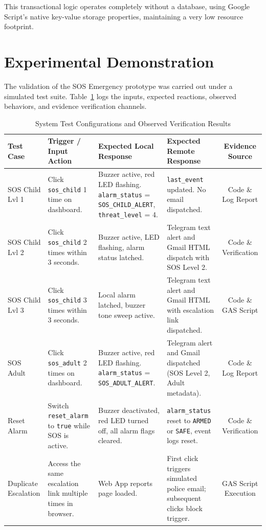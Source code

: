 \documentclass[conference]{IEEEtran}
\begin{document}
This transactional logic operates completely without a database, using Google Script's native key-value storage properties, maintaining a very low resource footprint.

\section{Experimental Demonstration}
The validation of the SOS Emergency prototype was carried out under a simulated test suite. Table~\ref{tab:test_cases} logs the inputs, expected reactions, observed behaviors, and evidence verification channels.

\begin{table}[!t]
\centering
\caption{System Test Configurations and Observed Verification Results}
\label{tab:test_cases}
\scriptsize
\renewcommand{\arraystretch}{1.2}
\begin{tabularx}{\textwidth}{l|p{3.2cm}|p{3.5cm}|p{3.5cm}|c}
\toprule
\textbf{Test Case} & \textbf{Trigger / Input Action} & \textbf{Expected Local Response} & \textbf{Expected Remote Response} & \textbf{Evidence Source} \\
\midrule
SOS Child Lvl 1 & Click \texttt{sos\_child} 1 time on dashboard. & Buzzer active, red LED flashing. \texttt{alarm\_status} = \texttt{SOS\_CHILD\_ALERT}, \texttt{threat\_level} = 4. & \texttt{last\_event} updated. No email dispatched. & Code \& Log Report \\
\hline
SOS Child Lvl 2 & Click \texttt{sos\_child} 2 times within 3 seconds. & Buzzer active, LED flashing, alarm status latched. & Telegram text alert and Gmail HTML dispatch with SOS Level 2. & Code \& Verification \\
\hline
SOS Child Lvl 3 & Click \texttt{sos\_child} 3 times within 3 seconds. & Local alarm latched, buzzer tone sweep active. & Telegram text alert and Gmail HTML with escalation link dispatched. & Code \& GAS Script \\
\hline
SOS Adult & Click \texttt{sos\_adult} 2 times on dashboard. & Buzzer active, red LED flashing. \texttt{alarm\_status} = \texttt{SOS\_ADULT\_ALERT}. & Telegram alert and Gmail dispatched (SOS Level 2, Adult metadata). & Code \& Log Report \\
\hline
Reset Alarm & Switch \texttt{reset\_alarm} to \texttt{true} while SOS is active. & Buzzer deactivated, red LED turned off, all alarm flags cleared. & \texttt{alarm\_status} reset to \texttt{ARMED} or \texttt{SAFE}, event logs reset. & Code \& Verification \\
\hline
Duplicate Escalation & Access the same escalation link multiple times in browser. & Web App reports page loaded. & First click triggers simulated police email; subsequent clicks block trigger. & GAS Script Execution \\
\bottomrule
\end{tabularx}
\end{table}
\end{document}
